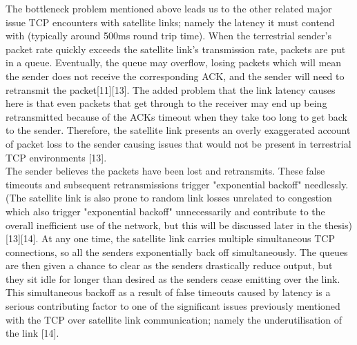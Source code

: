 \documentclass{uathesis}
\begin{document}
The bottleneck problem mentioned above leads us to the other related major issue TCP encounters with satellite links; namely the latency it must contend with (typically around 500ms round trip time). When the terrestrial sender's packet rate quickly exceeds the satellite link’s transmission rate, packets are put in a queue. Eventually, the queue may overflow, losing packets which will mean the sender does not receive the corresponding ACK, and the sender will need to retransmit the packet[11][13]. The added problem that the link latency causes here is that even packets that get through to the receiver may end up being retransmitted because of the ACKs timeout when they take too long to get back to the sender. Therefore, the satellite link presents an overly exaggerated account of packet loss to the sender causing issues that would not be present in terrestrial TCP environments [13].\\

The sender believes the packets have been lost and retransmits. These false timeouts and subsequent retransmissions trigger "exponential backoff" needlessly. (The satellite link is also prone to random link losses unrelated to congestion which also trigger "exponential backoff" unnecessarily and contribute to the overall inefficient use of the network, but this will be discussed later in the thesis) [13][14]. At any one time, the satellite link carries multiple simultaneous TCP connections, so all the senders exponentially back off simultaneously.  The queues are then given a chance to clear as the senders drastically reduce output, but they sit idle for longer than desired as the senders cease emitting over the link. This simultaneous backoff as a result of false timeouts caused by latency is a serious contributing factor to one of the significant issues previously mentioned with the TCP over satellite link communication; namely the underutilisation of the link [14].\\
\end{document}
